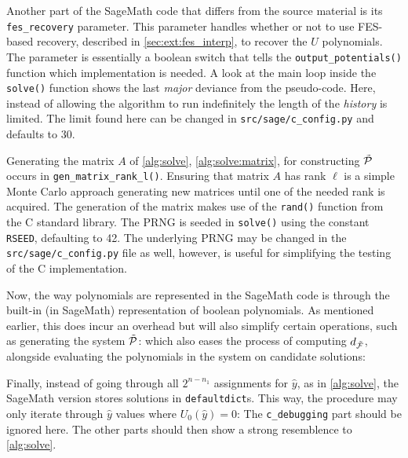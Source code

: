 Another part of the SageMath code that differs from the source material is its 
\texttt{fes\_recovery} parameter. This parameter handles whether or not to use FES-based recovery, described in \cref{sec:ext:fes_interp}, to recover the $U$ polynomials. The parameter is essentially a boolean switch that tells the \texttt{output\_potentials()} function which implementation is needed. A look at the main loop inside the \texttt{solve()} function shows the last \textit{major} deviance from the pseudo-code. Here, instead of allowing the algorithm to run indefinitely the length of the \textit{history} is limited. The limit found here can be changed in \texttt{src/sage/c\_config.py} and defaults to 30.

Generating the matrix $A$ of \cref{alg:solve}, \cref{alg:solve:matrix}, for constructing $\Tilde{\mathcal{P}}$ occurs in \texttt{gen\_matrix\_rank\_l()}. Ensuring that matrix $A$ has rank $\ell$ is a simple Monte Carlo approach generating new matrices until one of the needed rank is acquired. The generation of the matrix makes use of the \texttt{rand()} function from the C standard library. The PRNG is seeded in \texttt{solve()} using the constant \texttt{RSEED}, defaulting to 42. The underlying PRNG may be changed in the \texttt{src/sage/c\_config.py} file as well, however, is useful for simplifying the testing of the C implementation.

Now, the way polynomials are represented in the SageMath code is through the built-in (in SageMath) representation of boolean polynomials. As mentioned earlier, this does incur an overhead but will also simplify certain operations, such as generating the system $\Tilde{\mathcal{P}}$:
which also eases the process of computing $d_{\Tilde{\mathcal{F}}}$,
alongside evaluating the polynomials in the system on candidate solutions:

Finally, instead of going through all $2^{n - n_1}$ assignments for $\hat{y}$, as in \cref{alg:solve}, the SageMath version stores solutions in \texttt{defaultdict}s. This way, the procedure may only iterate through $\hat{y}$ values where $U_0(\hat{y}) = 0$:
The \texttt{c\_debugging} part should be ignored here. The other parts should then show a strong resemblence to \cref{alg:solve}.

